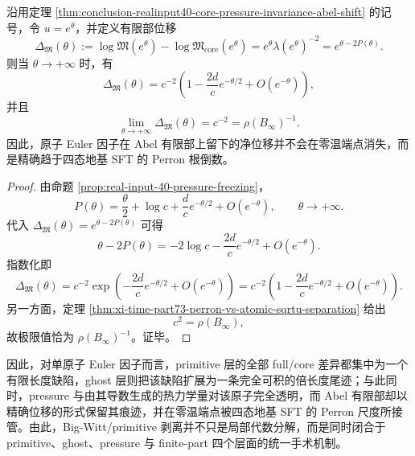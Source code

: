 \begin{corollary}\label{cor:conclusion-realinput40-zero-temp-finitepart-displacement}
沿用定理 \ref{thm:conclusion-realinput40-core-pressure-invariance-abel-shift} 的记号，令 \(u=e^\theta\)，并定义有限部位移
\[
\Delta_{\mathfrak M}(\theta)
:=
\log\mathfrak M(e^\theta)-\log\mathfrak M_{\mathrm{core}}(e^\theta)
=
e^\theta\lambda(e^\theta)^{-2}
=
e^{\theta-2P(\theta)}.
\]
则当 \(\theta\to+\infty\) 时，有
\[
\boxed{\;
\Delta_{\mathfrak M}(\theta)
=
c^{-2}\left(1-\frac{2d}{c}e^{-\theta/2}+O(e^{-\theta})\right),\;}
\]
并且
\[
\boxed{\;
\lim_{\theta\to+\infty}\Delta_{\mathfrak M}(\theta)
=
c^{-2}
=
\rho(B_\infty)^{-1}.\;}
\]
因此，原子 Euler 因子在 Abel 有限部上留下的净位移并不会在零温端点消失，而是精确趋于四态地基 SFT 的 Perron 根倒数。
\end{corollary}
\begin{proof}
由命题 \ref{prop:real-input-40-pressure-freezing}，
\[
P(\theta)
=
\frac{\theta}{2}+\log c+\frac{d}{c}e^{-\theta/2}+O(e^{-\theta}),
\qquad
\theta\to+\infty.
\]
代入
\(
\Delta_{\mathfrak M}(\theta)=e^{\theta-2P(\theta)}
\)
可得
\[
\theta-2P(\theta)
=
-2\log c-\frac{2d}{c}e^{-\theta/2}+O(e^{-\theta}).
\]
指数化即
\[
\Delta_{\mathfrak M}(\theta)
=
c^{-2}\exp\!\left(-\frac{2d}{c}e^{-\theta/2}+O(e^{-\theta})\right)
=
c^{-2}\left(1-\frac{2d}{c}e^{-\theta/2}+O(e^{-\theta})\right).
\]
另一方面，定理 \ref{thm:xi-time-part73-perron-vs-atomic-sqrtu-separation} 给出
\[
c^2=\rho(B_\infty),
\]
故极限值恰为 \(\rho(B_\infty)^{-1}\)。证毕。
\end{proof}

因此，对单原子 Euler 因子而言，primitive 层的全部 full/core 差异都集中为一个有限长度缺陷，ghost 层则把该缺陷扩展为一条完全可积的倍长度尾迹；与此同时，pressure 与由其导数生成的热力学量对该原子完全透明，而 Abel 有限部却以精确位移的形式保留其痕迹，并在零温端点被四态地基 SFT 的 Perron 尺度所接管。由此，Big-Witt/primitive 剥离并不只是局部代数分解，而是同时闭合于 primitive、ghost、pressure 与 finite-part 四个层面的统一手术机制。



\endinput
